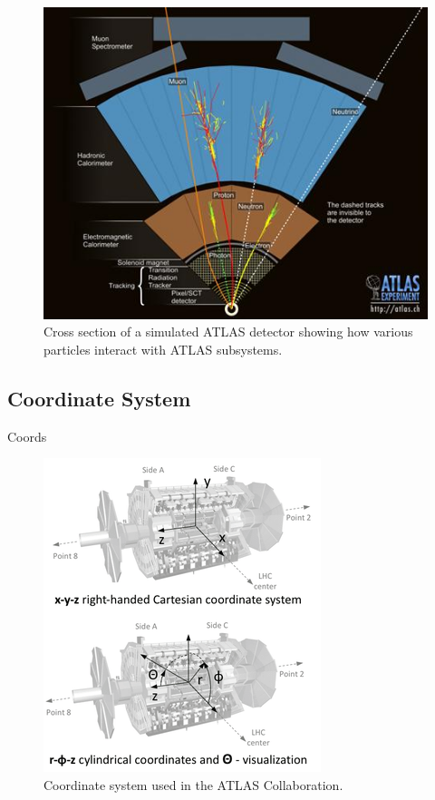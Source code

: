 \begin{figure}[h!]
	\centering
	\includegraphics[width=\columnwidth]{../ThesisImages/LHCImages/ParticleInteractions.jpg}
	\caption{Cross section of a simulated ATLAS detector showing how various particles interact with ATLAS subsystems.\cite{ParticleInteractions}
	}
	\label{fig:ATLASInteractions}
\end{figure}




\subsection{Coordinate System}
Coords
\begin{figure}[h!]
	\centering
	\includegraphics[width=0.5\columnwidth]{../ThesisImages/LHCImages/ATLASCoords.png}
	\caption{Coordinate system used in the ATLAS Collaboration.\cite{ATLASCoords}
	}
	\label{fig:ATLACoords}
\end{figure}



